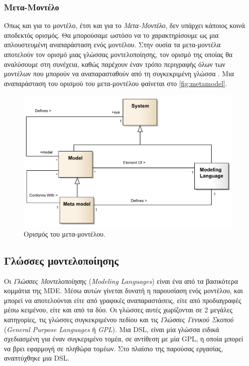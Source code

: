 \subsubsection{Μετα-Μοντέλο}
\label{subsubsec:metamodel}

Όπως και για το μοντέλο, έτσι και για το \textit{Μετα-Μοντέλο}, δεν υπάρχει κάποιος κοινά αποδεκτός ορισμός. Θα μπορούσαμε ωστόσο να το χαρακτηρίσουμε ως μια απλουστευμένη αναπαράσταση ενός μοντέλου. Στην ουσία τα μετα-μοντέλα αποτελούν τον ορισμό μιας γλώσσας μοντελοποίησης, τον ορισμό της οποίας θα αναλύσουμε στη συνέχεια, καθώς παρέχουν έναν τρόπο περιγραφής όλων των μοντέλων που μπορούν να αναπαρασταθούν από τη συγκεκριμένη γλώσσα \cite{bib:brambilla_2012}. Μια αναπαράσταση του ορισμού του μετα-μοντέλου φαίνεται στο \autoref{fig:metamodel}.

\begin{figure}[!ht]
	\centering
	\includegraphics[width=1\textwidth]{./images/chapter2/metamodel.png}
	\caption{Ορισμός του μετα-μοντέλου.}
	\label{fig:metamodel}
\end{figure}

\subsection{Γλώσσες μοντελοποίησης}
\label{subsec:dsls}

Οι \textit{Γλώσσες Μοντελοποίησης} (\textit{Modeling Languages}) είναι ένα από τα βασικότερα κομμάτια της MDE. Μέσω αυτών γίνεται δυνατή η παρουσίαση ενός μοντέλου, και μπορεί να αποτελούνται είτε από γραφικές αναπαραστάσεις, είτε από προδιαγραφές μέσω κειμένου, είτε και από τα δύο. Οι γλώσσες αυτές χωρίζονται σε 2 μεγάλες κατηγορίες, τις γλώσσες συγκεκριμένου πεδίου και τις \textit{Γλώσσες Γενικού Σκοπού} (\textit{General Purpose Languages} ή \textit{GPL}). Μια DSL, είναι μία γλώσσα ειδικά σχεδιασμένη για έναν συγκεριμένο τομέα, σε αντίθεση με μία GPL, η οποία μπορεί να βρει εφαρμογή σε πληθώρα τομέων. Στο πλαίσιο της παρούσας εργασίας, αναπτύχθηκε μια DSL.

